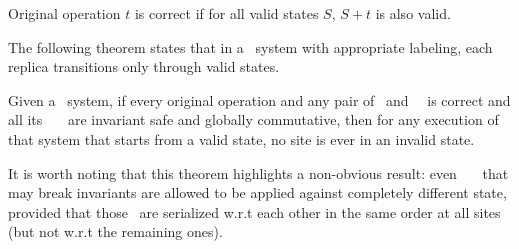 
\begin{mydef}
Original operation $t$ is correct if for
all valid states $S$, $S + t$ is also valid.
\label{def:correctoriginal}
\end{mydef}

The following theorem states that in a \RBct\ system with
  appropriate labeling, each replica transitions only through valid
  states. 


\begin{theorem}
Given a \RBct\ system,
  if every original operation and any pair of \initial\ and \shadow\ \operations\ is correct 
and all its \blue\ \shadow\ \operations\ are invariant safe and globally
  commutative, then for any execution of that system that starts
from a valid state, no
  site is ever in an invalid state.
\label{them:safe}
\end{theorem}

It is worth noting that this theorem highlights a non-obvious
result: even \red\ \shadow\ \operations\ that may break invariants are allowed
to be applied against completely different state, provided that those \operations\ are
serialized w.r.t each other in the same order at all sites (but not w.r.t
the remaining ones).

